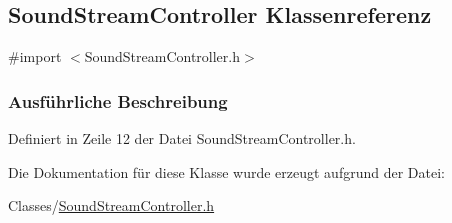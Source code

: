 \hypertarget{interface_sound_stream_controller}{
\subsection{SoundStreamController Klassenreferenz}
\label{interface_sound_stream_controller}
}


{\ttfamily \#import $<$SoundStreamController.h$>$}

\subsubsection{Ausführliche Beschreibung}


Definiert in Zeile 12 der Datei SoundStreamController.h.

Die Dokumentation für diese Klasse wurde erzeugt aufgrund der Datei:\begin{DoxyCompactItemize}
\item 
Classes/\hyperlink{_sound_stream_controller_8h}{SoundStreamController.h}\end{DoxyCompactItemize}

